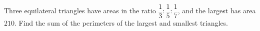 Three equilateral triangles have areas in the ratio $\dfrac13:\dfrac15:\dfrac17$, and the largest has area $210$. Find the sum of the perimeters of the largest and smallest triangles.
